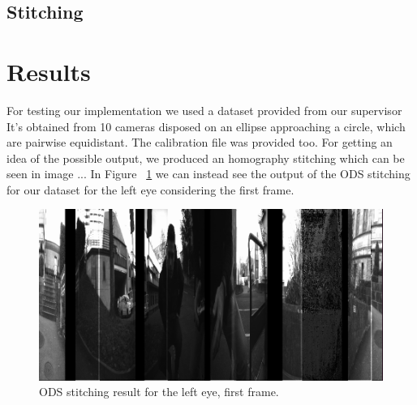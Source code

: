 \documentclass[10pt,twocolumn,letterpaper]{article}
\begin{document}
\subsection{Stitching}



\section{Results}
For testing our implementation we used a dataset provided from our supervisor It's obtained from 10 cameras disposed on an ellipse approaching a circle, which are pairwise equidistant. The calibration file was provided too. For getting an idea of the possible output, we produced an homography stitching which can be seen in image ...
In Figure ~\ref{lefteye} we can instead see the output of the ODS stitching for our dataset for the left eye considering the first frame.
\begin{figure}[t]
\begin{center}
   \includegraphics[width=0.7\linewidth]{pictures/frame0_lefteye_cwise.png}
\end{center}
   \caption{ODS stitching result for the left eye, first frame.}
\label{lefteye}
\end{figure}

\end{document}
